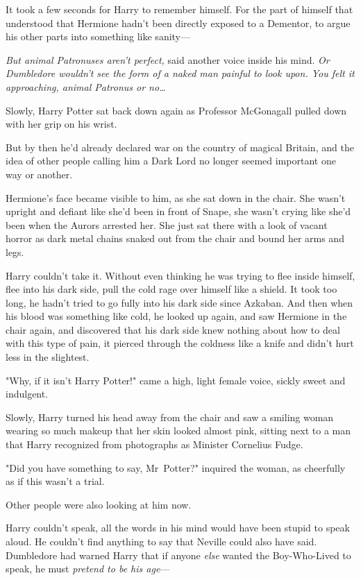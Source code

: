 It took a few seconds for Harry to remember himself. For the part of himself
that understood that Hermione hadn’t been directly exposed to a Dementor, to
argue his other parts into something like sanity—

\emph{But animal Patronuses aren’t perfect,} said another voice inside his
mind. \emph{Or Dumbledore wouldn’t see the form of a naked man painful to look
upon. You felt it approaching, animal Patronus or no…}

Slowly, Harry Potter sat back down again as Professor McGonagall pulled down
with her grip on his wrist.

But by then he’d already declared war on the country of magical Britain, and
the idea of other people calling him a Dark Lord no longer seemed important one
way or another.

Hermione’s face became visible to him, as she sat down in the chair. She wasn’t
upright and defiant like she’d been in front of Snape, she wasn’t crying like
she’d been when the Aurors arrested her. She just sat there with a look of
vacant horror as dark metal chains snaked out from the chair and bound her arms
and legs.

Harry couldn’t take it. Without even thinking he was trying to flee inside
himself, flee into his dark side, pull the cold rage over himself like a
shield. It took too long, he hadn’t tried to go fully into his dark side since
Azkaban. And then when his blood was something like cold, he looked up again,
and saw Hermione in the chair again, and discovered that his dark side knew
nothing about how to deal with this type of pain, it pierced through the
coldness like a knife and didn’t hurt less in the slightest.

"Why, if it isn’t Harry Potter!" came a high, light female voice, sickly sweet
and indulgent.

Slowly, Harry turned his head away from the chair and saw a smiling woman
wearing so much makeup that her skin looked almost pink, sitting next to a man
that Harry recognized from photographs as Minister Cornelius Fudge.

"Did you have something to say, Mr~Potter?" inquired the woman, as cheerfully
as if this wasn’t a trial.

Other people were also looking at him now.

Harry couldn’t speak, all the words in his mind would have been stupid to speak
aloud. He couldn’t find anything to say that Neville could also have said.
Dumbledore had warned Harry that if anyone \emph{else} wanted the Boy-Who-Lived
to speak, he must \emph{pretend to be his age}—

